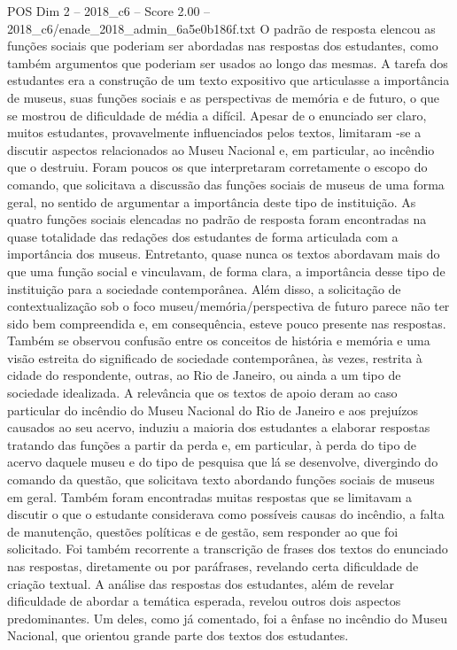 \begin{textsample}{POS Dim 2 – 2018\_c6 – Score 2.00 – 2018\_c6/enade\_2018\_admin\_6a5e0b186f.txt}
O padrão de resposta elencou as funções sociais que poderiam ser abordadas nas respostas dos estudantes, como também argumentos que poderiam ser usados ao longo das mesmas.
A tarefa dos estudantes era a construção de um texto expositivo que articulasse a importância de museus, suas funções sociais e as perspectivas de memória e de futuro, o que se mostrou de dificuldade de média a difícil.
Apesar de o enunciado ser claro, muitos estudantes, provavelmente influenciados pelos textos, limitaram -se a discutir aspectos relacionados ao Museu Nacional e, em particular, ao incêndio que o destruiu.
Foram poucos os que interpretaram corretamente o escopo do comando, que solicitava a discussão das funções sociais de museus de uma forma geral, no sentido de argumentar a importância deste tipo de instituição.
As quatro funções sociais elencadas no padrão de resposta foram encontradas na quase totalidade das redações dos estudantes de forma articulada com a importância dos museus.
Entretanto, quase nunca os textos abordavam mais do que uma função social e vinculavam, de forma clara, a importância desse tipo de instituição para a sociedade contemporânea.
Além disso, a solicitação de contextualização sob o foco museu/memória/perspectiva de futuro parece não ter sido bem compreendida e, em consequência, esteve pouco presente nas respostas.
Também se observou confusão entre os conceitos de história e memória e uma visão estreita do significado de sociedade contemporânea, às vezes, restrita à cidade do respondente, outras, ao Rio de Janeiro, ou ainda a um tipo de sociedade idealizada.
A relevância que os textos de apoio deram ao caso particular do incêndio do Museu Nacional do Rio de Janeiro e aos prejuízos causados ao seu acervo, induziu a maioria dos estudantes a elaborar respostas tratando das funções a partir da perda e, em particular, à perda do tipo de acervo daquele museu e do tipo de pesquisa que lá se desenvolve, divergindo do comando da questão, que solicitava texto abordando funções sociais de museus em geral.
Também foram encontradas muitas respostas que se limitavam a discutir o que o estudante considerava como possíveis causas do incêndio, a falta de manutenção, questões políticas e de gestão, sem responder ao que foi solicitado.
Foi também recorrente a transcrição de frases dos textos do enunciado nas respostas, diretamente ou por paráfrases, revelando certa dificuldade de criação textual.
A análise das respostas dos estudantes, além de revelar dificuldade de abordar a temática esperada, revelou outros dois aspectos predominantes.
Um deles, como já comentado, foi a ênfase no incêndio do Museu Nacional, que orientou grande parte dos textos dos estudantes.

\end{textsample}
